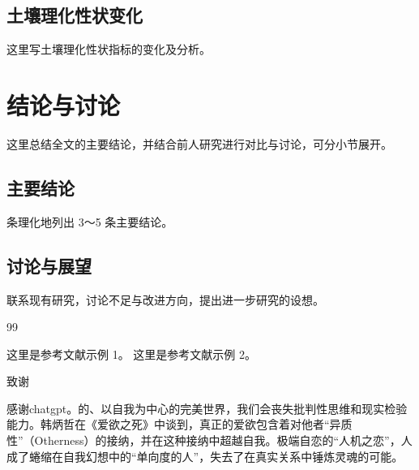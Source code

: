 \documentclass[UTF8,oneside]{ctexrep} %
\newenvironment{maintext}{%
	\zihao{5}%
	\songti
	\setlength{\parindent}{2em}%
	\setlength{\baselineskip}{20pt}%
}{}
\begin{document}
\begin{maintext}
		\subsection{土壤理化性状变化}
		这里写土壤理化性状指标的变化及分析。
		
		\section{结论与讨论}
		
		这里总结全文的主要结论，并结合前人研究进行对比与讨论，可分小节展开。
		
		\subsection{主要结论}
		条理化地列出 3～5 条主要结论。
		
		\subsection{讨论与展望}
		联系现有研究，讨论不足与改进方向，提出进一步研究的设想。
		
		\clearpage
		\begin{thebibliography}{99}
			 这里是参考文献示例 1。
			 这里是参考文献示例 2。
		\end{thebibliography}
		
		
		\clearpage
		{\centering\heiti{} 致\quad 谢\par}
		感谢chatgpt。的、以自我为中心的完美世界，我们会丧失批判性思维和现实检验能力。韩炳哲在《爱欲之死》中谈到，真正的爱欲包含着对他者“异质性”（Otherness）的接纳，并在这种接纳中超越自我。极端自恋的“人机之恋”，人成了蜷缩在自我幻想中的“单向度的人”，失去了在真实关系中锤炼灵魂的可能。
	\end{maintext}
	
\end{document}
